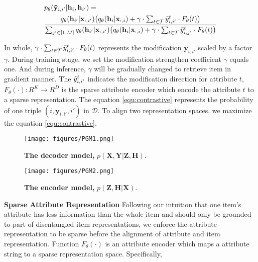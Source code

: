 \begin{equation}
\begin{aligned}
&p_{\theta}(\mathbf{\Tilde{y}}_{i,i'}|\mathbf{h}_{i}, \mathbf{h}_{i'}) =\\
&\frac{q_{\theta}(\mathbf{h}_{i'}|\mathbf{x}_{:,i'}) \big(q_{\theta}(\mathbf{h}_{i}|\mathbf{x}_{:,i}) + \gamma \cdot \sum_{t \in \mathcal{T}} \Tilde{y}_{i,i'}^{t} \cdot F_{\theta}(t)\big)}{\sum_{j' \in [1,M]} q_{\theta}(\mathbf{h}_{i'}|\mathbf{x}_{:,i'})   \big(q_{\theta}(\mathbf{h}_{i}|\mathbf{x}_{:,i}) + \gamma \cdot \sum_{t \in \mathcal{T}} \Tilde{y}_{i,j'}^{t} \cdot F_{\theta}(t)\big)}
\label{equ:contrastive}
\end{aligned}
\end{equation}

In whole, $\gamma \cdot \sum_{t \in \mathcal{T}} \Tilde{y}_{i,i'}^{t} \cdot F_{\theta}(t)$ represents the modification $\mathbf{y}_{i,i'}$ scaled by a factor $\gamma$. During training stage, we set the modification strengthen coefficient $\gamma$ equals one. And during inference, $\gamma$ will be gradually changed to retrieve item in gradient manner. The $\Tilde{y}_{i,i'}^{t}$ indicates the modification direction for attribute $t$, $F_{\theta}(\cdot):R^{K} \rightarrow R^{D}$ is the sparse attribute encoder which encode the attribute $t$ to a sparse representation. The equation \ref{equ:contrastive} represents the probability of one triple $(i, \mathbf{y}_{i,i'}, i')$ in $\mathcal{D}$. To align two representation spaces, we maximize the equation \ref{equ:contrastive}.

\begin{figure}[h]
\centering
\texttt{[image: figures/PGM1.png]}
\caption{\textbf{The decoder model,} $p(\mathbf{X,Y}|\mathbf{Z,H})$.}
\label{fig:pgm1}
 \end{figure}


\begin{figure}[h]
\centering
\texttt{[image: figures/PGM2.png]}
\caption{\textbf{The encoder model,} $p(\mathbf{Z,H}|\mathbf{X})$.}
\label{fig:pgm2}
\end{figure}


\textbf{Sparse Attribute Representation} Following our intuition that one item's attribute has less information than the whole item and should only be grounded to part of disentangled item representations, we enforce the attribute representation to be sparse before the alignment of attribute and item representation. Function $F_{\theta}(\cdot)$ is an attribute encoder which maps a attribute string to a sparse representation space. Specifically,

